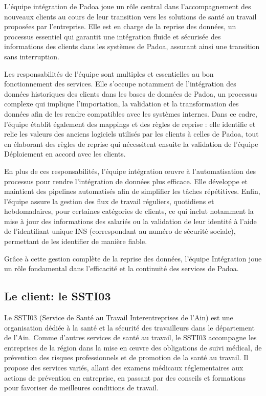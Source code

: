 L’équipe intégration de Padoa joue un rôle central dans l’accompagnement des
nouveaux clients au cours de leur transition vers les solutions de santé au
travail proposées par l’entreprise. Elle est en charge de la reprise des
données, un processus essentiel qui garantit une intégration fluide et
sécurisée des informations des clients dans les systèmes de Padoa, assurant
ainsi une transition sans interruption.

Les responsabilités de l’équipe sont multiples et essentielles au bon
fonctionnement des services. Elle s’occupe notamment de l’intégration des
données historiques des clients dans les bases de données de Padoa, un
processus complexe qui implique l’importation, la validation et la
transformation des données afin de les rendre compatibles avec les systèmes
internes. Dans ce cadre, l’équipe établit également des mappings et des règles
de reprise : elle identifie et relie les valeurs des anciens logiciels utilisés
par les clients à celles de Padoa, tout en élaborant des règles de reprise qui
nécessitent ensuite la validation de l’équipe Déploiement en accord avec les
clients.

En plus de ces responsabilités, l’équipe intégration œuvre à l’automatisation
des processus pour rendre l’intégration de données plus efficace. Elle
développe et maintient des pipelines automatisés afin de simplifier les tâches
répétitives. Enfin, l’équipe assure la gestion des flux de travail
réguliers, quotidiens et hebdomadaires, pour certaines catégories de clients,
ce qui inclut notamment la mise à jour des informations des salariés ou la
validation de leur identité à l’aide de l’identifiant unique INS (correspondant
au numéro de sécurité sociale), permettant de les identifier de manière fiable.

Grâce à cette gestion complète de la reprise des données, l’équipe Intégration
joue un rôle fondamental dans l’efficacité et la continuité des services de
Padoa.

\subsection{Le client: le SSTI03}

Le SSTI03 (Service de Santé au Travail Interentreprises de l’Ain) est une organisation dédiée à la santé et la sécurité des travailleurs dans le département de l’Ain. Comme d'autres services de santé au travail, le SSTI03 accompagne les entreprises de la région dans la mise en œuvre des obligations de suivi médical, de prévention des risques professionnels et de promotion de la santé au travail. Il propose des services variés, allant des examens médicaux réglementaires aux actions de prévention en entreprise, en passant par des conseils et formations pour favoriser de meilleures conditions de travail.

